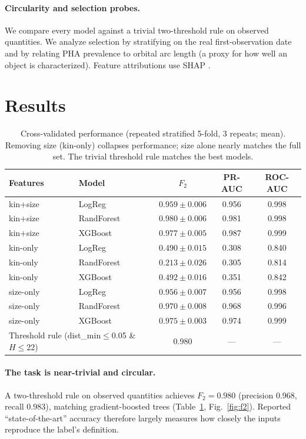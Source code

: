 \documentclass[11pt]{article}
\begin{document}
\paragraph{Circularity and selection probes.}
We compare every model against a trivial two-threshold rule on observed quantities. We
analyze selection by stratifying on the real first-observation date and by relating
PHA prevalence to orbital arc length (a proxy for how well an object is
characterized). Feature attributions use SHAP \citep{shap}.

\section{Results}

\begin{table}[t]
\centering
\caption{Cross-validated performance (repeated stratified 5-fold, 3 repeats; mean).
Removing size (kin-only) collapses performance; size alone nearly matches the full
set. The trivial threshold rule matches the best models.}
\label{tab:cv}
\begin{tabular}{llccc}
\toprule
Features & Model & $F_2$ & PR-AUC & ROC-AUC \\
\midrule
kin+size  & LogReg     & $0.959\pm0.006$ & 0.956 & 0.998 \\
kin+size  & RandForest & $0.980\pm0.006$ & 0.981 & 0.998 \\
kin+size  & XGBoost    & $0.977\pm0.005$ & 0.987 & 0.999 \\
kin-only  & LogReg     & $0.490\pm0.015$ & 0.308 & 0.840 \\
kin-only  & RandForest & $0.213\pm0.026$ & 0.305 & 0.814 \\
kin-only  & XGBoost    & $0.492\pm0.016$ & 0.351 & 0.842 \\
size-only & LogReg     & $0.956\pm0.007$ & 0.956 & 0.998 \\
size-only & RandForest & $0.970\pm0.008$ & 0.968 & 0.996 \\
size-only & XGBoost    & $0.975\pm0.003$ & 0.974 & 0.999 \\
\midrule
\multicolumn{2}{l}{Threshold rule (dist\_min$\le$0.05 \& $H\le$22)} & 0.980 & --- & --- \\
\bottomrule
\end{tabular}
\end{table}

\paragraph{The task is near-trivial and circular.}
A two-threshold rule on observed quantities achieves $F_2=0.980$ (precision 0.968,
recall 0.983), matching gradient-boosted trees (Table~\ref{tab:cv},
Fig.~\ref{fig:f2}). Reported ``state-of-the-art'' accuracy therefore largely measures
how closely the inputs reproduce the label's definition.
\end{document}
